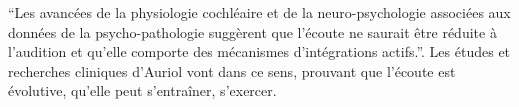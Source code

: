 \enquote {Les avancées de la physiologie cochléaire et de la neuro-psychologie associées aux données de la psycho-pathologie suggèrent que l'écoute ne saurait être réduite à l'audition et qu'elle comporte des mécanismes d'intégrations actifs.}\autocite[p.58]{auriol:cle}. Les études et recherches cliniques d'Auriol vont dans ce sens, prouvant que l'écoute est évolutive, qu'elle peut  s'entraîner, s'exercer.


